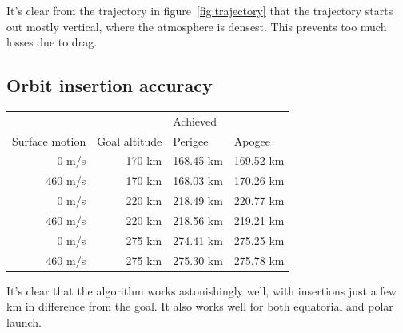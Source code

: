 \documentclass[11pt]{article}
\begin{document}
It's clear from the trajectory in figure~\ref{fig:trajectory} that the trajectory starts out mostly vertical, where the atmosphere is densest. This prevents too much losses due to drag.

\subsection{Orbit insertion accuracy}
\begin{center}
  \begin{tabular}{ r | r  | l  l  }
     &   &  Achieved  \\
    Surface motion & Goal altitude & Perigee & Apogee \\
    \hline
    0 m/s & 170 km & 168.45 km & 169.52 km \\
    460 m/s & 170 km & 168.03 km & 170.26 km \\
    \hline
    0 m/s & 220 km & 218.49 km & 220.77 km \\
    460 m/s & 220 km  & 218.56 km & 219.21 km \\
    \hline
    0 m/s & 275 km & 274.41 km & 275.25 km \\
    460 m/s & 275 km & 275.30 km & 275.78 km
  \end{tabular}
\end{center}
It's clear that the algorithm works astonishingly well, with insertions just a few km in difference from the goal. It also works well for both equatorial and polar launch.
\end{document}

